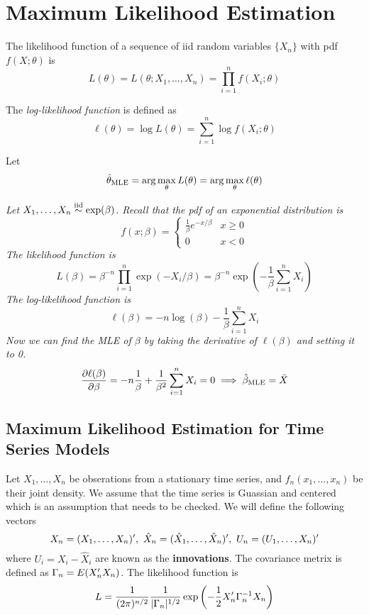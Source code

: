 \chapter{Maximum Likelihood Estimation}

\begin{definition}
    The likelihood function of a sequence of iid random variables $\{X_n\}$ with pdf $f(X;\theta)$ is 
    \[L(\theta) = L(\theta; X_1, \ldots, X_n) = \prod_{i=1}^n f(X_i;\theta) \]
\end{definition}

The \emph{log-likelihood function} is defined as 
\[\ell (\theta) = \log L(\theta) = \sum_{i=1}^n \log f(X_i; \theta) \]

\begin{definition}
    Let 
    \[\hat{\theta}_{\operatorname{MLE}} = \arg\max_\theta L(\theta) = \arg\max_{\theta}\ell(\theta)\]
\end{definition}

\begin{example}
    \emph{
        Let $X_1, \ldots, X_n \overset{\mathrm{iid}}{\sim} \exp(\beta)$. Recall that the pdf of an exponential distribution is
        \[f(x;\beta) = \begin{cases}
            \frac{1}{\beta}e^{-x/\beta} & x \geq 0 \\
            0 & x < 0
        \end{cases}\]
        The likelihood function is
        \[L(\beta) = \beta^{-n}\prod_{i=1}^n \exp(-X_i/\beta) = \beta^{-n}\exp\left(-\frac{1}{\beta} \sum_{i=1}^nX_i\right)\]
        The log-likelihood function is
        \[\ell(\beta) = -n\log(\beta) - \frac{1}{\beta}\sum_{i=1}^nX_i\]
        Now we can find the MLE of $\beta$ by taking the derivative of $\ell(\beta)$ and setting it to 0.
        \[\frac{\partial \ell(\beta)}{\partial\beta} = -n\frac{1}{\beta}+\frac{1}{\beta^2}\sum_{i=1}^nX_i = 0 \implies \hat{\beta}_{\operatorname{MLE}} = \bar{X}\]
    }
\end{example}


\section{Maximum Likelihood Estimation for Time Series Models}
Let $X_1, \ldots, X_n$ be obserations from a stationary time series, and $f_n(x_1,\ldots, x_n)$ be their joint density. We assume that the time series is Guassian and centered which is an assumption that needs to be checked. We will define the following vectors 
\[\boldmath{X}_n = (X_1,\ldots,X_n)', \ \boldmath{\hat{X}}_n = (\hat{X}_1, \ldots, \hat{X}_n)', \ \boldmath{U}_n = (U_1, \ldots, X_n)'\]
where $U_i = X_i - \hat{X}_i$ are known as the \textbf{innovations}. The covariance metrix is defined as $\Gamma_n = E(\boldmath{X}_n'\boldmath{X}_n)$. The likelihood function is
\[L = \frac{1}{(2\pi)^{n/2}}\frac{1}{|\Gamma_n|^{1/2}}\exp\left(-\frac{1}{2}\boldmath{X}_n'\Gamma_n^{-1}\boldmath{X}_n\right)\]